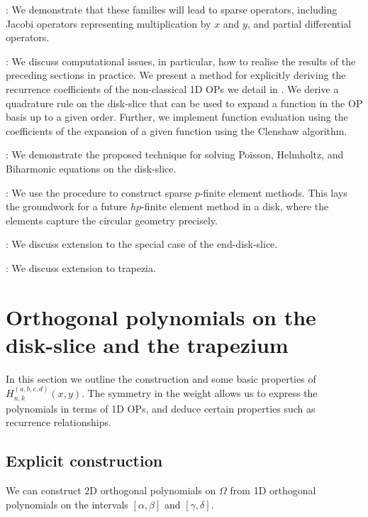 \documentclass[11pt, oneside]{article}   	%
\newcommand{\hdop}{H}
\newcommand{\hdopnkabcd}{\hdop_{n,k}^{(a,b,c,d)}}
\begin{document}
\noindent{}: We demonstrate that these families will lead to sparse operators, including Jacobi operators representing multiplication by $x$ and $y$, and partial differential operators.

\noindent{}: We discuss computational issues, in particular, how to realise the results of the preceding sections in practice. We present a method for explicitly deriving the recurrence coefficients of the non-classical 1D OPs we detail in . We derive a quadrature rule on the disk-slice that can be used to expand a function in the OP basis up to a given order. Further, we implement function evaluation using the coefficients of the expansion of a given function using the Clenshaw algorithm.

\noindent{}: We demonstrate the proposed technique for solving Poisson, Helmholtz, and Biharmonic equations on the disk-slice.  

\noindent{}: We use the procedure to construct sparse $p$-finite element methods. This lays the groundwork for a future $hp$-finite element method in a disk, where the elements capture the circular geometry precisely.

\noindent{}: We discuss extension to the special case of the end-disk-slice.

\noindent{}: We discuss extension to trapezia.


\section{Orthogonal polynomials on the disk-slice and the trapezium}\label{Section:OPs}

In this section we outline the construction and some basic properties of $\hdopnkabcd(x,y)$. The symmetry in the weight allows us to express the polynomials in terms of 1D OPs, and deduce certain properties such as recurrence relationships. 

\subsection{Explicit construction}

We can construct 2D orthogonal polynomials on $\Omega$ from 1D orthogonal polynomials on the intervals \([\alpha,\beta]\) and \([\gamma,\delta]\). 
\end{document}
